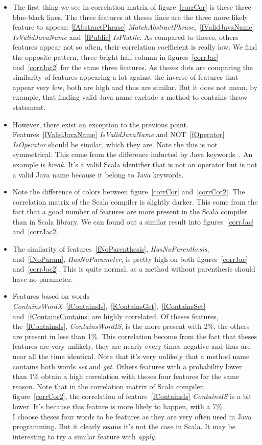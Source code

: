 \documentclass[12pt]{article}
\begin{document}
\begin{itemize}
\item The first thing we see in correlation matrix of figure~\ref{corrCor} is these three blue-black lines. The three features  at theses lines are the three more likely feature to appear: \ref{fAbstractPhrase} \textit{MatchAbstractPhrase},~\ref{fValidJavaName} \textit{IsValidJavaName} and~\ref{fPublic} \textit{IsPlublic}. As compared to theses, others features appear not so often, their correlation coefficient is really low. We find the opposite pattern, three bright half column in figures~\ref{corrJac} and~\ref{corrJac2} for the same three features. As theses dots are comparing the similarity of features appearing a lot against the inverse of features that appear very few, both are high and thus are similar. But it does not mean, by example, that finding valid Java name exclude a method to contains throw statement.
\item However, there exist an exception to the previous point. Features~\ref{fValidJavaName} \textit{IsValidJavaName} and NOT~\ref{fOperator} \textit{IsOperator} should be similar, which they are. Note the this is not symmetrical. This come from the difference inducted by Java keywords~\cite{jls_keyword}. An example is \textit{break}. It's a valid Scala identifier that is not an operator but is not a valid Java name because it belong to Java keywords.
\item Note the difference of colors between figure~\ref{corrCor} and~\ref{corrCor2}. The correlation matrix of the Scala compiler is slightly darker. This come from the fact that a good number of features are more present in the Scala compiler than in Scala library. We can found out a similar result into figures~\ref{corrJac} and~\ref{corrJac2}.
\FloatBarrier
\item The similarity of features~\ref{fNoParenthesis}, \textit{HasNoParenthesis}, and~\ref{fNoParam}, \textit{HasNoParameter}, is pretty high on both figures~\ref{corrJac} and~\ref{corrJac2}. This is quite normal, as a method without parenthesis should have no parameter.
\item Features based on words \textit{ContainsWordX}~\ref{fContainsIs},~\ref{fContainsGet},~\ref{fContainsSet} and~\ref{fContainsContains} are highly correlated. Of theses features, the~\ref{fContainsIs}, \textit{ContainsWordIS}, is the more present with 2\%, the others are present in less than 1\%. This correlation become from the fact that theses features are very unlikely, they are nearly every times negative and thus are near all the time identical. Note that it's very unlikely that a method name contains both words \textit{set} and \textit{get}. Others features with a probability lower than 1\% obtain a high correlation with theses four features for the same reason. Note that in the correlation matrix of Scala compiler, figure~\ref{corrCor2}, the correlation of feature~\ref{fContainsIs} \textit{ContainsIS} is a bit lower. It's because this feature is more likely to happen, with a 7\%.\\I choose theses four words to be features as they are very often used in Java programming. But it clearly seams it's not the case in Scala. It may be interesting to try a similar feature with \textit{apply}. 

\end{itemize}
\end{document}
